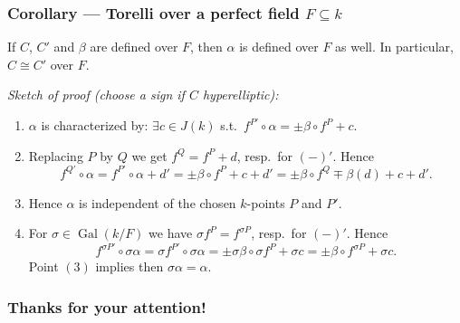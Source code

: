 \documentclass[notheorems, hyperref]{beamer}
\theoremstyle{darkgreentheorem}
\theoremstyle{darkbluedefinition}
\theoremstyle{darkredexample}
\theoremstyle{remark}
\begin{document}
\begin{frame}
    \frametitle{Corollary --- Torelli over a perfect field $F\subseteq k$} 
    \begin{tcolorbox}[colback=blue!5!white,colframe=blue!5!white]
    If $C$, $C'$ and $\beta$ are defined over $F$, then $\alpha$ is defined over $F$ as well.
	In particular, $C\cong C'$ over $F$.
    \end{tcolorbox}
    \textit{Sketch of proof (choose a sign if $C$ hyperelliptic):}
    \begin{enumerate}[label=(\arabic*)]
	\item $\alpha$ is characterized by: $\exists c\in J(k)$ s.t.~$f^{P'}\circ \alpha=\pm \beta\circ f^{P}+c$.
	\item Replacing $P$ by $Q$ we get $f^{Q}=f^{P}+d$, resp.~for $(-)'$.
	    Hence
	    \[ f^{Q'}\circ \alpha=f^{P'}\circ \alpha+d'=\pm \beta \circ f^{P}+c+d'=\pm \beta \circ f^{Q}\mp \beta(d)+c+d'. \]
	\item Hence $\alpha$ is independent of the chosen $k$-points $P$ and $P'$.
	\item For $\sigma\in \operatorname{Gal}(k/F)$ we have $\sigma f^{P}=f^{\sigma P}$, resp.~for $(-)'$.
	    Hence
	    \[ f^{\sigma P'}\circ \sigma\alpha =\sigma f^{P'}\circ \sigma \alpha=\pm \sigma \beta\circ \sigma f^{P}+\sigma c=\pm \beta \circ f^{\sigma P}+\sigma c. \]
	    Point $(3)$ implies then $\sigma \alpha=\alpha$.
    \end{enumerate}
\end{frame}

\begin{frame}
    \frametitle{Thanks for your attention!}
    
    
\end{frame}
\end{document}
